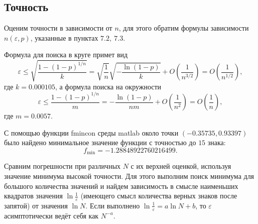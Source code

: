 \documentclass[12pt, a4paper]{article}
\begin{document}
\subsection{Точность}
Оценим точности в зависимости от $n$, для этого обратим формулы зависимости $n(\varepsilon,p)$, указанные в пунктах $7.2,\ 7.3$. 

Формула для поиска в круге примет вид
\[ \varepsilon \leqslant \sqrt{\frac{1-(1-p)^{1/n}}{k}} = \sqrt{\frac{1}{n}}\sqrt{-\frac{\ln(1-p)}{k}} + O\left(\frac{1}{n^{3/2}}\right) = O\left(\frac{1}{n^{1/2}}\right), \]
где $k = 0.000105$, а формула поиска на окружности
\[\varepsilon \leqslant \frac{1-(1-p)^{1/n}}{m} = -\frac{\ln(1-p)}{nm}+O\left( \frac 1{n^2} \right) = O \left( \frac 1n \right),\]
где $m=0.0057$.

С помощью функции fmincon среды matlab около точки $(-0.35735, 0.93397)$ было найдено минимальное значение функции с точностью до $15$ знака: \[f_{\min} =-1.28848922760216499.\] 

Сравним погрешности при различных $N$ с их верхней оценкой, используя значение минимума высокой точности. Для этого выполним поиск минимума для большого количества значений и найдем зависимость в смысле наименьших квадратов значения $\ln{\frac 1\varepsilon}$ (имеющего смысл количества верных знаков после запятой) от значения $\ln N$. Если выполнено $\ln{\frac 1\varepsilon} = a\ln N + b$, то $\varepsilon$ асимптотически ведёт себя как $N^{-a}$.
\end{document}
